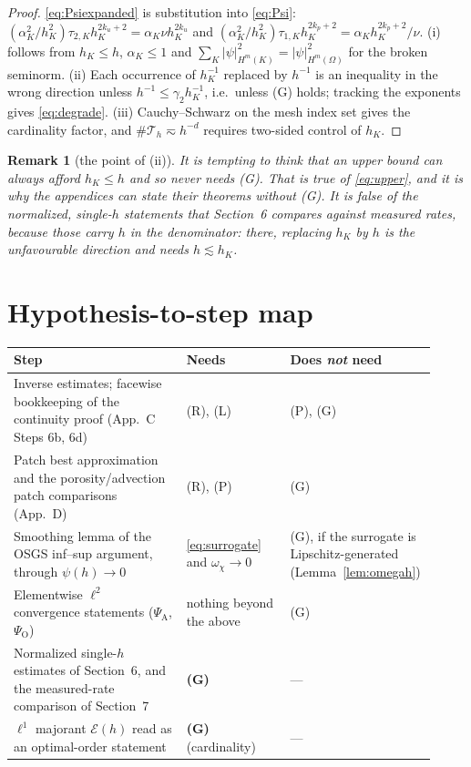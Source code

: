 \documentclass[11pt,a4paper]{article}
\newtheorem{remark}[lemma]{Remark}
\theoremstyle{definition}
\newcommand{\Th}{\mathcal{T}_h}
\begin{document}
\begin{proof}
\eqref{eq:Psiexpanded} is substitution into \eqref{eq:Psi}:
$(\alpha_K^2/h_K^2)\tau_{2,K}h_K^{2k_u+2}=\alpha_K\nu h_K^{2k_u}$ and
$(\alpha_K^2/h_K^2)\tau_{1,K}h_K^{2k_p+2}=\alpha_Kh_K^{2k_p+2}/\nu$. (i) follows from
$h_K\le h$, $\alpha_K\le1$ and $\sum_K\lvert\psi\rvert^2_{H^{m}(K)}=\lvert\psi\rvert^2_{H^m(\Omega)}$
for the broken seminorm. (ii) Each occurrence of $h_K^{-1}$ replaced by $h^{-1}$ is an inequality in
the wrong direction unless $h^{-1}\le\gamma_2 h_K^{-1}$, i.e.\ unless (G) holds; tracking the
exponents gives \eqref{eq:degrade}. (iii) Cauchy--Schwarz on the mesh index set gives the
cardinality factor, and $\#\Th\eqsim h^{-d}$ requires two-sided control of $h_K$.
\end{proof}

\begin{remark}[the point of (ii)]
It is tempting to think that an upper bound can always afford $h_K\le h$ and so never needs (G).
That is true of \eqref{eq:upper}, and it is why the appendices can state their theorems without (G).
It is false of the \emph{normalized}, single-$h$ statements that Section~6 compares against measured
rates, because those carry $h$ in the denominator: there, replacing $h_K$ by $h$ is the
\emph{unfavourable} direction and needs $h\lesssim h_K$.
\end{remark}

\section{Hypothesis-to-step map}

\begin{center}
\small
\begin{tabular}{@{}p{0.40\linewidth}p{0.24\linewidth}p{0.28\linewidth}@{}}
\toprule
Step & Needs & Does \emph{not} need \\
\midrule
Inverse estimates; facewise bookkeeping of the continuity proof (App.~C Steps 6b, 6d) & (R), (L) & (P), (G) \\
\addlinespace
Patch best approximation and the porosity/advection patch comparisons (App.~D) & (R), (P) & (G) \\
\addlinespace
Smoothing lemma of the OSGS inf--sup argument, through $\psi(h)\to0$ & \eqref{eq:surrogate} and $\omega_\chi\to0$ & (G), if the surrogate is Lipschitz-generated (Lemma~\ref{lem:omegah}) \\
\addlinespace
Elementwise $\ell^2$ convergence statements ($\Psi_{\mathrm A}$, $\Psi_{\mathrm O}$) & nothing beyond the above & (G) \\
\addlinespace
Normalized single-$h$ estimates of Section~6, and the measured-rate comparison of Section~7 & \textbf{(G)} & --- \\
\addlinespace
$\ell^1$ majorant $\mathcal E(h)$ read as an optimal-order statement & \textbf{(G)} (cardinality) & --- \\
\bottomrule
\end{tabular}
\end{center}
\end{document}
